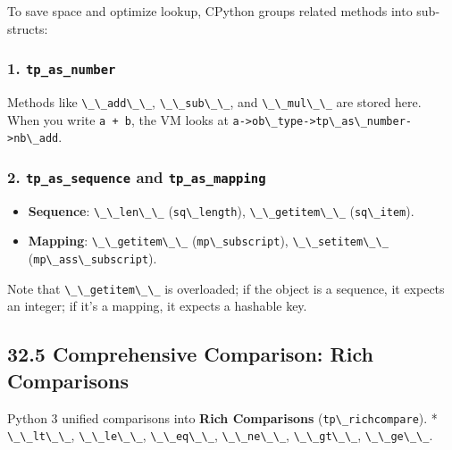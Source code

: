 To save space and optimize lookup, CPython groups related methods into
sub-structs:

\hypertarget{tp_as_number}{%
\subsubsection{\texorpdfstring{1.
\texttt{tp\_as\_number}}{1. tp\_as\_number}}\label{tp_as_number}}

Methods like \passthrough{\lstinline!\_\_add\_\_!},
\passthrough{\lstinline!\_\_sub\_\_!}, and
\passthrough{\lstinline!\_\_mul\_\_!} are stored here. When you write
\passthrough{\lstinline!a + b!}, the VM looks at
\passthrough{\lstinline!a->ob\_type->tp\_as\_number->nb\_add!}.

\hypertarget{tp_as_sequence-and-tp_as_mapping}{%
\subsubsection{\texorpdfstring{2. \texttt{tp\_as\_sequence} and
\texttt{tp\_as\_mapping}}{2. tp\_as\_sequence and tp\_as\_mapping}}\label{tp_as_sequence-and-tp_as_mapping}}

\begin{itemize}
\tightlist
\item
  \textbf{Sequence}: \passthrough{\lstinline!\_\_len\_\_!}
  (\passthrough{\lstinline!sq\_length!}),
  \passthrough{\lstinline!\_\_getitem\_\_!}
  (\passthrough{\lstinline!sq\_item!}).
\item
  \textbf{Mapping}: \passthrough{\lstinline!\_\_getitem\_\_!}
  (\passthrough{\lstinline!mp\_subscript!}),
  \passthrough{\lstinline!\_\_setitem\_\_!}
  (\passthrough{\lstinline!mp\_ass\_subscript!}).
\end{itemize}

Note that \passthrough{\lstinline!\_\_getitem\_\_!} is overloaded; if
the object is a sequence, it expects an integer; if it's a mapping, it
expects a hashable key.

\hypertarget{comprehensive-comparison-rich-comparisons}{%
\subsection{32.5 Comprehensive Comparison: Rich
Comparisons}\label{comprehensive-comparison-rich-comparisons}}

Python 3 unified comparisons into \textbf{Rich Comparisons}
(\passthrough{\lstinline!tp\_richcompare!}). *
\passthrough{\lstinline!\_\_lt\_\_!},
\passthrough{\lstinline!\_\_le\_\_!},
\passthrough{\lstinline!\_\_eq\_\_!},
\passthrough{\lstinline!\_\_ne\_\_!},
\passthrough{\lstinline!\_\_gt\_\_!},
\passthrough{\lstinline!\_\_ge\_\_!}.

